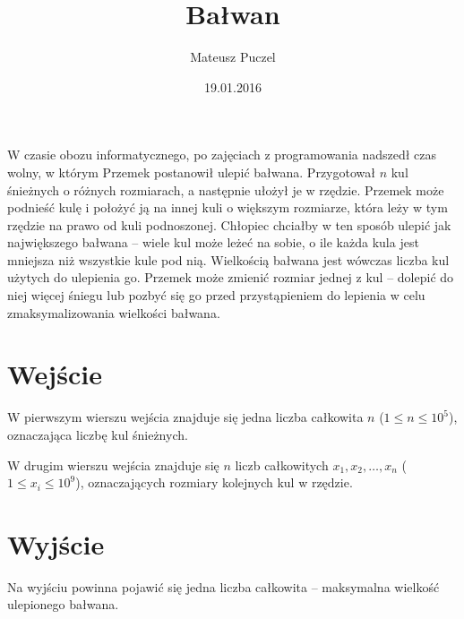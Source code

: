 \documentclass[zad,zawodnik,utf8]{sinol}
\title{Bałwan}
\author{Mateusz Puczel} %
\date{19.01.2016}
\begin{document}
\begin{tasktext}%
W czasie obozu informatycznego, po zajęciach z programowania nadszedł czas wolny, w którym Przemek postanowił ulepić bałwana.
Przygotował $n$ kul śnieżnych o różnych rozmiarach, a następnie ułożył je w rzędzie. Przemek może podnieść kulę i położyć
ją na innej kuli o większym rozmiarze, która leży w tym rzędzie na prawo od kuli podnoszonej. Chłopiec chciałby w ten sposób
ulepić jak największego bałwana -- wiele kul może leżeć na sobie, o ile każda kula jest mniejsza niż wszystkie kule pod nią. Wielkością bałwana jest wówczas liczba kul użytych do ulepienia go. Przemek może zmienić rozmiar jednej z kul -- dolepić
do niej więcej śniegu lub pozbyć się go przed przystąpieniem do lepienia w celu zmaksymalizowania wielkości bałwana.

  \section{Wejście}
W pierwszym wierszu wejścia znajduje się jedna liczba całkowita $n$ ($1 \leq n \leq 10^5$), oznaczająca liczbę kul śnieżnych.

W drugim wierszu wejścia znajduje się $n$ liczb całkowitych $x_1, x_2, \ldots, x_n$ ($1 \leq x_i \leq 10^9$), oznaczających rozmiary kolejnych kul w rzędzie.

  \section{Wyjście}
Na wyjściu powinna pojawić się jedna liczba całkowita -- maksymalna wielkość ulepionego bałwana.
  \makecompactexample

\end{tasktext}
\end{document}
